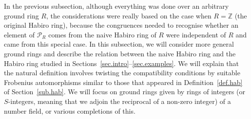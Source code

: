 \documentclass[12pt,reqno]{amsart}
\theoremstyle{definition}
\def\BZ{\mathbb Z}
\def\calP{\mathcal P}
\begin{document}
In the previous subsection, although everything was done over an arbitrary ground
ring $R$, the considerations were really based on the case when $R=\BZ$ (the
original Habiro ring), because the congruences needed to recognise whether an
element of $\calP_R$ comes from the naive Habiro ring of $R$ were independent of $R$
and came from this special case.
In this subsection, we will consider more general ground rings and describe the
relation between the naive Habiro ring and the Habiro ring studied in
Sections~\hbox{\ref{sec.intro}--\ref{sec.examples}}.
We will explain that the natural definition
involves twisting the compatibility conditions by suitable
Frobenius automorphisms similar to those that appeared in Definition~\ref{def.hab}
of Section~\ref{sub.hab}.
We will focus on ground
rings given by rings of integers (or $S$-integers, meaning that we adjoin the
reciprocal of a non-zero integer) of a number field, or various completions of this.

\medskip
\end{document}
